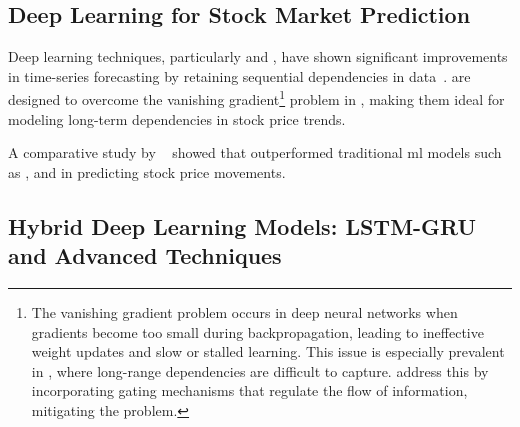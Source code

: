 \subsection{Deep Learning for Stock Market Prediction}

Deep learning techniques, particularly  and , have shown
significant improvements in time-series forecasting by retaining sequential dependencies in
data~\parencite{chang2024StockPrediction}.  are designed to overcome
the vanishing 
gradient\footnote{The vanishing gradient problem occurs in deep neural networks when
gradients become too small during backpropagation, leading to ineffective weight updates 
and slow or stalled learning. This issue is especially prevalent in , 
where long-range dependencies are difficult to capture.  address this by
incorporating gating mechanisms that regulate the flow of information, mitigating the
problem.} problem in , making them ideal for modeling long-term 
dependencies in stock price trends.

A comparative study by 
\citeauthor{nabipour2020DeepLearning}~\parencite{nabipour2020DeepLearning} showed 
that  outperformed traditional \acrfull{ml} models such as , and 
 in predicting stock price movements. 

\subsection{Hybrid Deep Learning Models: LSTM-GRU and Advanced Techniques}

